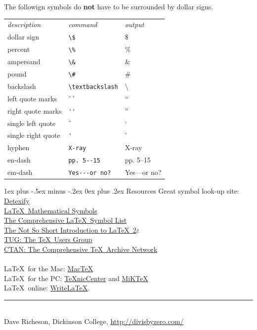 \documentclass[10pt,UTF8,a4paper]{ctexart}
\makeatletter
\renewcommand{\section}{\@startsection{section}{1}{0mm}%
                                {1ex plus -.5ex minus -.2ex}%
                                {0ex plus .2ex}%
                                {\normalfont\large\bfseries}}
\makeatother
\begin{document}
\begin{multicols}{3}
The followign symbols do \textbf{not} have to be surrounded by dollar signs.

\begin{tabular}{lll}
\emph{description} & \emph{command} & \emph{output}\\
dollar sign & \verb!\$! & \$ \\
percent & \verb!\%! & \% \\
ampersand & \verb!\&! & \& \\
pound & \verb!\#! & \# \\
backslash & \verb!\textbackslash! & \textbackslash \\
left quote marks & \verb!``! & `` \\
right quote marks & \verb!''! & '' \\
single left quote  & \verb!`! & ` \\
single right quote  & \verb!'! & ' \\
hyphen & \verb!X-ray! & X-ray\\
en-dash & \verb!pp. 5--15! & pp. 5--15 \\
em-dash & \verb!Yes---or no?! & Yes---or no? 
\end{tabular}

\section{Resources}
Great symbol look-up site: \href{http://detexify.kirelabs.org/}{Detexify}\\
\href{http://amath.colorado.edu/documentation/LaTeX/Symbols.pdf}{\LaTeX\ Mathematical Symbols}\\
\href{ftp://tug.ctan.org/pub/tex-archive/info/symbols/comprehensive/symbols-letter.pdf}{The Comprehensive \LaTeX\ Symbol List}\\ 
\href{http://mirrors.med.harvard.edu/ctan/info/lshort/english/lshort.pdf}{The Not So Short Introduction to \LaTeX\ 2$\varepsilon$}\\
\href{http://www.tug.org/}{TUG: The \TeX\ Users Group}\\
\href{http://www.ctan.org/}{CTAN: The Comprehensive \TeX\ Archive Network}\\
~\\
\LaTeX\ for the Mac: \href{http://www.tug.org/mactex/}{Mac\TeX}\\
\LaTeX\ for the PC: \href{http://www.texniccenter.org/}{{\TeX}nicCenter} and \href{http://miktex.org/}{MiK\TeX}\\
\LaTeX\ online: \href{http://www.writelatex.com/}{WriteLaTeX}.
\vfill
\hrule
~\\
Dave Richeson, Dickinson College, \href{http://divisbyzero.com/}{http://divisbyzero.com/}
\end{multicols}
\end{document}
